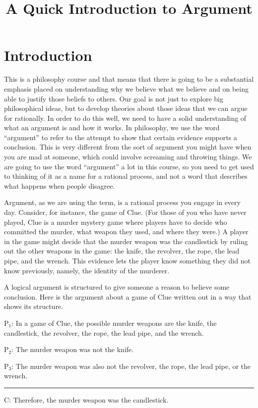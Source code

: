 \title{A Quick Introduction to Argument}
\date{}
\maketitle


\section{Introduction}

This is a philosophy course and that means that there is going to be a substantial emphasis placed on understanding why we believe what we believe and on being able to justify those beliefs to others. Our goal is not just to explore big philosophical ideas, but to develop theories about those ideas that we can argue for rationally. In order to do this well, we need to have a solid understanding of what an argument is and how it works. In philosophy, we use the word ``argument'' to refer to the attempt to show that certain evidence supports a conclusion. This is very different from the sort of argument you might have when you are mad at someone, which could involve screaming and throwing things. We are going to use the word ``argument'' a lot in this course, so you need to get used to thinking of it as a name for a rational process, and not a word that describes what happens when people disagree.

Argument, as we are using the term, is a rational process you engage in every day. Consider, for instance, the game of Clue. (For those of you who have never played, Clue is a murder mystery game where players have to decide who committed the murder, what weapon they used, and where they were.) A player in the game might decide that the murder weapon was the candlestick by ruling out the other weapons in the game: the knife, the revolver, the rope, the lead pipe, and the wrench. This evidence lets the player know something they did not know previously, namely, the identity of the murderer.

A logical argument is structured to give someone a reason to believe some conclusion. Here is the argument about a game of Clue written out in a way that shows its structure. 


\label{argClue}
\begin{earg}
\item[P$_1$:] In a game of Clue, the possible murder weapons are the knife, the candlestick, the revolver, the rope, the lead pipe, and the wrench.
\item[P$_2$:] The murder weapon was not the knife.
\item[P$_3$:] The murder weapon was also not the revolver, the rope, the lead pipe, or the wrench.
\vspace{-.5em}
\item [] \rule{0.9\linewidth}{.5pt} 
\item[C:] Therefore, the murder weapon was the candlestick.
\end{earg} 

